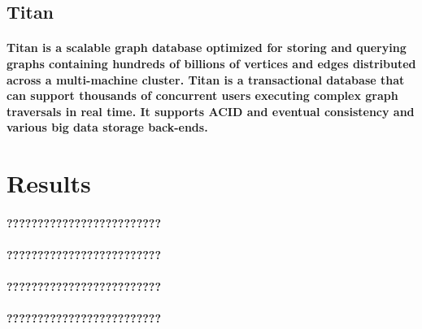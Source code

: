 \documentclass{acm_proc_article-sp}
\begin{document}
\subsection{Titan}
\paragraph{Titan is a scalable graph database optimized for storing and querying graphs containing hundreds of billions of vertices and edges distributed across a multi-machine cluster. Titan is a transactional database that can support thousands of concurrent users executing complex graph traversals in real time. It supports ACID and eventual consistency and various big data storage back-ends.\cite{chang1997titan}}
\pagebreak
\section{Results}
\paragraph{?????????????????????????}
\paragraph{?????????????????????????}
\paragraph{?????????????????????????}
\paragraph{?????????????????????????}
\pagebreak


\end{document}

